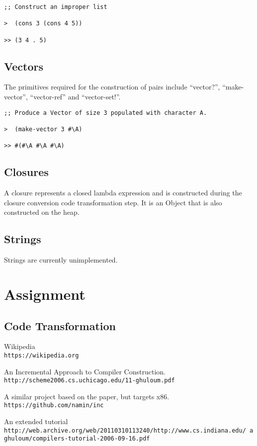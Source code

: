 \documentclass{article}
\begin{document}
\begin{verbatim}
;; Construct an improper list

>  (cons 3 (cons 4 5))

>> (3 4 . 5)
\end{verbatim}


\subsection{Vectors}

The primitives required for the construction of pairs include ``vector?'', ``make-vector'', ``vector-ref'' and ``vector-set!''.

\begin{verbatim}
;; Produce a Vector of size 3 populated with character A.

>  (make-vector 3 #\A) 

>> #(#\A #\A #\A)
\end{verbatim}

\subsection{Closures}

A closure represents a closed lambda expression and is constructed during the closure conversion code transformation step. It is an Object that is also constructed on the heap.

\subsection{Strings}

Strings are currently unimplemented. 

\section{Assignment}



\subsection{Code Transformation}



\begin{thebibliography}{5}

Wikipedia
\\\texttt{https://wikipedia.org}

An Incremental Approach to Compiler Construction.
\\\texttt{http://scheme2006.cs.uchicago.edu/11-ghuloum.pdf}

A similar project based on the paper, but targets x86.
\\\texttt{https://github.com/namin/inc}

An extended tutorial 
\\\texttt{http://web.archive.org/web/20110310113240/http://www.cs.indiana.edu/~aghuloum/compilers-tutorial-2006-09-16.pdf}

\end{thebibliography}  
\end{document}
